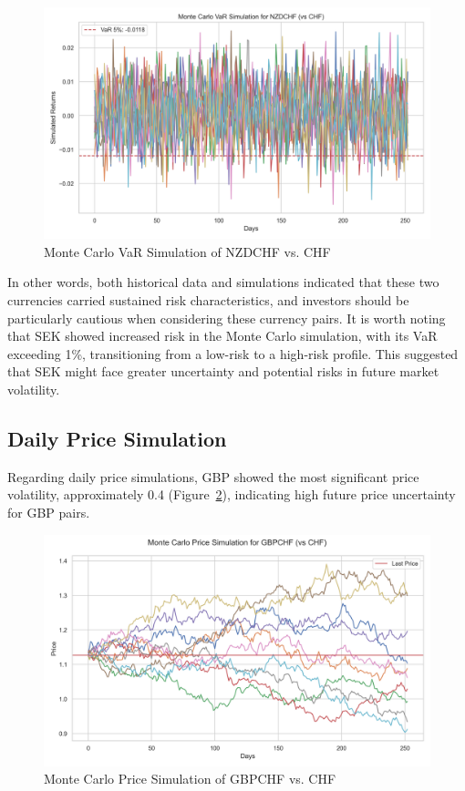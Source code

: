 \documentclass{article}
\begin{document}
\begin{figure}[H]
    \centering   \includegraphics[width=0.75\linewidth]{../../reports/figures/monte_carlo_var_simulation_NZDCHF_vs_CHF.png}
    \caption{Monte Carlo VaR Simulation of NZDCHF vs. CHF}  \label{fig:monte_carlo_var_simulation_NZDCHF_vs_CHF}
\end{figure}

In other words, both historical data and simulations indicated that these two currencies carried sustained risk characteristics, and investors should be particularly cautious when considering these currency pairs. It is worth noting that SEK showed increased risk in the Monte Carlo simulation, with its VaR exceeding 1\%, transitioning from a low-risk to a high-risk profile. This suggested that SEK might face greater uncertainty and potential risks in future market volatility.

\subsection{Daily Price Simulation}
Regarding daily price simulations, GBP showed the most significant price volatility, approximately 0.4 (Figure~\ref{fig:monte_carlo_price_simulation_GBPCHF_vs_CHF}), indicating high future price uncertainty for GBP pairs. 

\begin{figure}[H]
    \centering  \includegraphics[width=0.75\linewidth]{../../reports/figures/monte_carlo_price_simulation_GBPCHF_vs_CHF.png}
    \caption{Monte Carlo Price Simulation of GBPCHF vs. CHF}  \label{fig:monte_carlo_price_simulation_GBPCHF_vs_CHF}
\end{figure}
\end{document}
